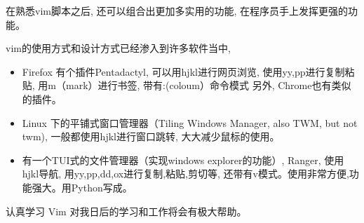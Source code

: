 在熟悉vim脚本之后, 还可以组合出更加多实用的功能, 在程序员手上发挥更强的功能。

vim的使用方式和设计方式已经渗入到许多软件当中, 
    \begin{itemize}
        \item Firefox 有个插件Pentadactyl, 可以用hjkl进行网页浏览, 使用yy,pp进行复制粘贴, 用m（mark）进行书签, 带有:(coloum）命令模式
            另外, Chrome也有类似的插件。
        \item Linux 下的平铺式窗口管理器（Tiling Windows Manager, also TWM, but not twm), 一般都使用hjkl进行窗口跳转, 大大减少鼠标的使用。
        \item 有一个TUI式的文件管理器（实现windows explorer的功能）, Ranger, 使用hjkl导航, 用yy,pp,dd,o{x}进行复制,粘贴,剪切等, 还带有v模式。使用非常方便,功能强大。用Python写成。
    \end{itemize}

认真学习 Vim 对我日后的学习和工作将会有极大帮助。
